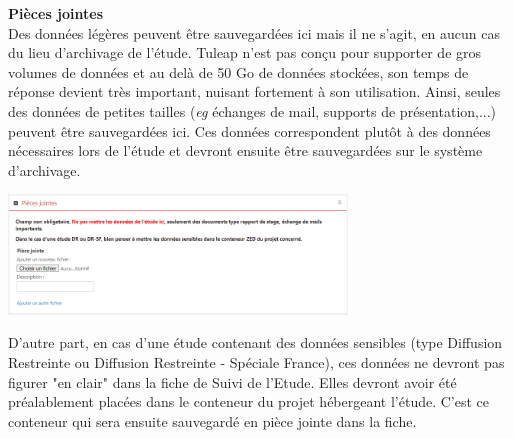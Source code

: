 \vspace{0.5cm}

\begin{minipage}[c]{0.45\linewidth}
\textbf{Pièces jointes}\\
Des données légères peuvent être sauvegardées ici mais il ne s'agit, en aucun cas du lieu d'archivage de l'étude. Tuleap n'est pas conçu pour supporter de gros volumes de données et au delà de 50 Go de données stockées, son temps de réponse devient très important, nuisant fortement à son utilisation. Ainsi, seules des données de petites tailles (\textit{eg} échanges de mail, supports de présentation,...) peuvent être sauvegardées ici. Ces données correspondent plutôt à des données nécessaires lors de l'étude et devront ensuite être sauvegardées sur le système d'archivage.\\
\end{minipage} \hfill
\begin{minipage}[c]{0.5\linewidth}
   \includegraphics[width=9cm]{pictures/GEA-PJ.png}\vspace*{0.2cm}

\end{minipage}

D'autre part, en cas d'une étude contenant des données sensibles (type Diffusion Restreinte ou Diffusion Restreinte - Spéciale France), ces données ne devront pas figurer "en clair" dans la fiche de Suivi de l'Etude. Elles devront avoir été préalablement placées dans le conteneur du projet hébergeant l'étude. C'est ce conteneur qui sera ensuite sauvegardé en pièce jointe dans la fiche.

\vspace{0.5cm}

